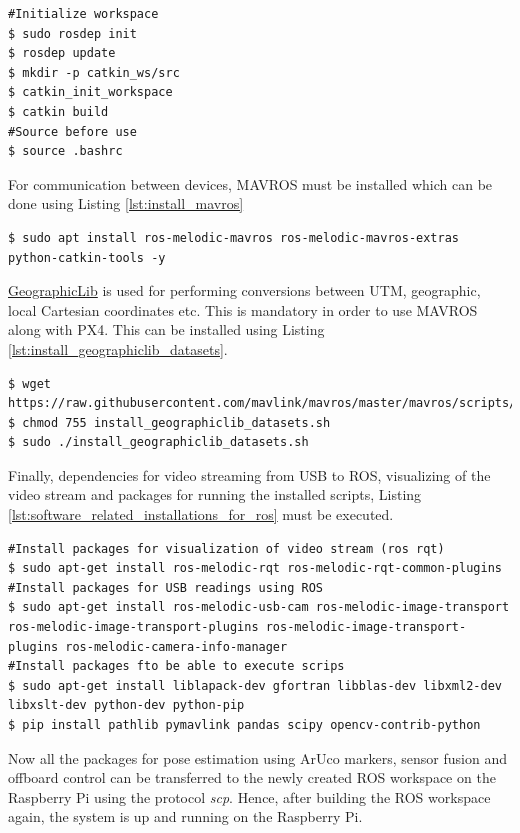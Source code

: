 \documentclass[../Head/report.tex]{subfiles}
\begin{document}
\begin{lstlisting}[frame=none, caption={Initiating ROS workspace},label=lst:init_ros_workspace]
#Initialize workspace
$ sudo rosdep init
$ rosdep update
$ mkdir -p catkin_ws/src
$ catkin_init_workspace 
$ catkin build
#Source before use
$ source .bashrc
\end{lstlisting}

For communication between devices, MAVROS must be installed which can be done using Listing \ref{lst:install_mavros}

\begin{lstlisting}[frame=none, caption={Installation of MAVROS},label=lst:install_mavros]
$ sudo apt install ros-melodic-mavros ros-melodic-mavros-extras python-catkin-tools -y
\end{lstlisting}

\href{https://geographiclib.sourceforge.io/}{GeographicLib} is used for performing conversions between UTM, geographic, local Cartesian coordinates etc. This is mandatory in order to use MAVROS along with PX4. This can be installed using Listing \ref{lst:install_geographiclib_datasets}. 
\begin{lstlisting}[frame=none, caption={Fetching and installation of the geographiclib dataset},label=lst:install_geographiclib_datasets]
$ wget https://raw.githubusercontent.com/mavlink/mavros/master/mavros/scripts/install_geographiclib_datasets.sh
$ chmod 755 install_geographiclib_datasets.sh
$ sudo ./install_geographiclib_datasets.sh
\end{lstlisting}

Finally, dependencies for video streaming from USB to ROS, visualizing of the video stream and packages for running the installed scripts, Listing \ref{lst:software_related_installations_for_ros} must be executed. 

\begin{lstlisting}[frame=none, caption={Installation of ROS ralated software },label=lst:software_related_installations_for_ros]
#Install packages for visualization of video stream (ros rqt)
$ sudo apt-get install ros-melodic-rqt ros-melodic-rqt-common-plugins
#Install packages for USB readings using ROS
$ sudo apt-get install ros-melodic-usb-cam ros-melodic-image-transport ros-melodic-image-transport-plugins ros-melodic-image-transport-plugins ros-melodic-camera-info-manager
#Install packages fto be able to execute scrips
$ sudo apt-get install liblapack-dev gfortran libblas-dev libxml2-dev libxslt-dev python-dev python-pip
$ pip install pathlib pymavlink pandas scipy opencv-contrib-python
\end{lstlisting}

Now all the packages for pose estimation using ArUco markers, sensor fusion and offboard control can be transferred to the newly created ROS workspace on the Raspberry Pi using the protocol \textit{scp}. Hence, after building the ROS workspace again, the system is up and running on the Raspberry Pi.   

\end{document}

